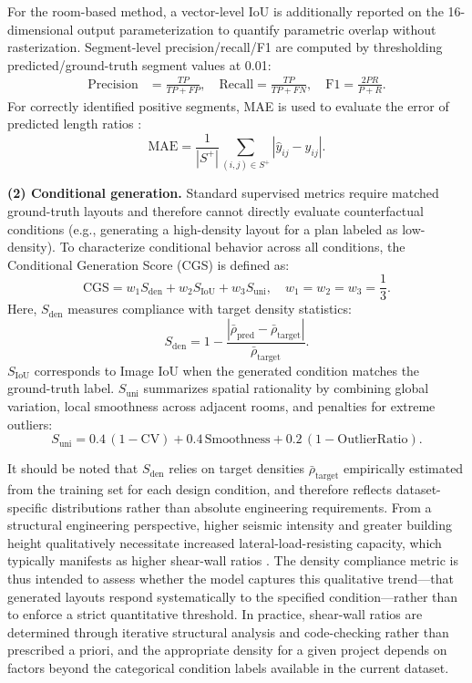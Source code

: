 For the room-based method, a vector-level IoU is additionally reported on the 16-dimensional output parameterization to quantify parametric overlap without rasterization. Segment-level precision/recall/F1 are computed by thresholding predicted/ground-truth segment values at 0.01:
\begin{align*}
\text{Precision}&=\frac{TP}{TP+FP}, \quad
\text{Recall}=\frac{TP}{TP+FN}, \quad
\text{F1}=\frac{2PR}{P+R}.
\end{align*}
For correctly identified positive segments, MAE is used to evaluate the error of predicted length ratios \cite{Chai_2014}:
\[
\text{MAE}=\frac{1}{|S^+|}\sum_{(i,j)\in S^+}|\hat y_{ij}-y_{ij}|.
\]

\textbf{(2) Conditional generation.} Standard supervised metrics require matched ground-truth layouts and therefore cannot directly evaluate counterfactual conditions (e.g., generating a high-density layout for a plan labeled as low-density). To characterize conditional behavior across all conditions, the Conditional Generation Score (CGS) is defined as:
\[
\text{CGS}=w_1 S_{\text{den}}+w_2 S_{\text{IoU}}+w_3 S_{\text{uni}},
\quad w_1=w_2=w_3=\frac13.
\]
Here, $S_{\text{den}}$ measures compliance with target density statistics:
\[
S_{\text{den}}=1-\frac{|\bar\rho_{\text{pred}}-\bar\rho_{\text{target}}|}{\bar\rho_{\text{target}}}.
\]
$S_{\text{IoU}}$ corresponds to Image IoU when the generated condition matches the ground-truth label. $S_{\text{uni}}$ summarizes spatial rationality by combining global variation, local smoothness across adjacent rooms, and penalties for extreme outliers:
\[
S_{\text{uni}}=0.4\,(1-\text{CV})+0.4\,\text{Smoothness}+0.2\,(1-\text{OutlierRatio}).
\]

It should be noted that $S_{\text{den}}$ relies on target densities $\bar\rho_{\text{target}}$ empirically estimated from the training set for each design condition, and therefore reflects dataset-specific distributions rather than absolute engineering requirements. From a structural engineering perspective, higher seismic intensity and greater building height qualitatively necessitate increased lateral-load-resisting capacity, which typically manifests as higher shear-wall ratios \cite{GB500112010Code2016,qianDesignTallBuilding2018,zhangShearWallLayout2017}. The density compliance metric is thus intended to assess whether the model captures this qualitative trend---that generated layouts respond systematically to the specified condition---rather than to enforce a strict quantitative threshold. In practice, shear-wall ratios are determined through iterative structural analysis and code-checking rather than prescribed a priori, and the appropriate density for a given project depends on factors beyond the categorical condition labels available in the current dataset.



